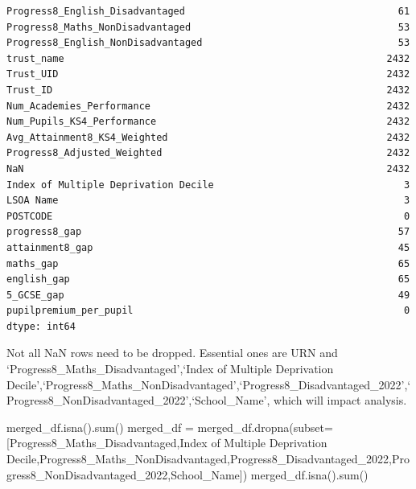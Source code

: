 \documentclass[
  letterpaper,
  DIV=11,
  numbers=noendperiod]{scrartcl}
\newenvironment{Shaded}{\begin{snugshade}}{\end{snugshade}}
\newcommand{\BuiltInTok}[1]{\textcolor[rgb]{0.00,0.23,0.31}{#1}}
\newcommand{\NormalTok}[1]{\textcolor[rgb]{0.00,0.23,0.31}{#1}}
\newcommand{\OperatorTok}[1]{\textcolor[rgb]{0.37,0.37,0.37}{#1}}
\newcommand{\StringTok}[1]{\textcolor[rgb]{0.13,0.47,0.30}{#1}}
\begin{document}
\begin{verbatim}
Progress8_English_Disadvantaged                                     61
Progress8_Maths_NonDisadvantaged                                    53
Progress8_English_NonDisadvantaged                                  53
trust_name                                                        2432
Trust_UID                                                         2432
Trust_ID                                                          2432
Num_Academies_Performance                                         2432
Num_Pupils_KS4_Performance                                        2432
Avg_Attainment8_KS4_Weighted                                      2432
Progress8_Adjusted_Weighted                                       2432
NaN                                                               2432
Index of Multiple Deprivation Decile                                 3
LSOA Name                                                            3
POSTCODE                                                             0
progress8_gap                                                       57
attainment8_gap                                                     45
maths_gap                                                           65
english_gap                                                         65
5_GCSE_gap                                                          49
pupilpremium_per_pupil                                               0
dtype: int64
\end{verbatim}

Not all NaN rows need to be dropped. Essential ones are URN and
`Progress8\_Maths\_Disadvantaged',`Index of Multiple Deprivation
Decile',`Progress8\_Maths\_NonDisadvantaged',`Progress8\_Disadvantaged\_2022',`Progress8\_NonDisadvantaged\_2022',`School\_Name',
which will impact analysis.

\begin{Shaded}
\begin{Highlighting}[]
\NormalTok{merged\_df.isna().}\BuiltInTok{sum}\NormalTok{()}
\NormalTok{merged\_df }\OperatorTok{=}\NormalTok{ merged\_df.dropna(subset}\OperatorTok{=}\NormalTok{[}\StringTok{\textquotesingle{}Progress8\_Maths\_Disadvantaged\textquotesingle{}}\NormalTok{,}\StringTok{\textquotesingle{}Index of Multiple Deprivation Decile\textquotesingle{}}\NormalTok{,}\StringTok{\textquotesingle{}Progress8\_Maths\_NonDisadvantaged\textquotesingle{}}\NormalTok{,}\StringTok{\textquotesingle{}Progress8\_Disadvantaged\_2022\textquotesingle{}}\NormalTok{,}\StringTok{\textquotesingle{}Progress8\_NonDisadvantaged\_2022\textquotesingle{}}\NormalTok{,}\StringTok{\textquotesingle{}School\_Name\textquotesingle{}}\NormalTok{])}
\NormalTok{merged\_df.isna().}\BuiltInTok{sum}\NormalTok{()}
\end{Highlighting}
\end{Shaded}
\end{document}
